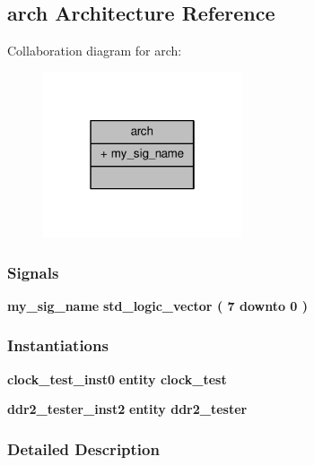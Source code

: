 \subsection{arch Architecture Reference}
\label{classtst__top_1_1arch}


Collaboration diagram for arch\+:\nopagebreak
\begin{figure}[H]
\begin{center}
\leavevmode
\includegraphics[width=166pt]{d9/d9e/classtst__top_1_1arch__coll__graph}
\end{center}
\end{figure}
\subsubsection*{Signals}
 \begin{DoxyCompactItemize}
\item 
{\bf my\+\_\+sig\+\_\+name} {\bfseries \textcolor{comment}{std\+\_\+logic\+\_\+vector}\textcolor{vhdlchar}{ }\textcolor{vhdlchar}{(}\textcolor{vhdlchar}{ }\textcolor{vhdlchar}{ } \textcolor{vhdldigit}{7} \textcolor{vhdlchar}{ }\textcolor{keywordflow}{downto}\textcolor{vhdlchar}{ }\textcolor{vhdlchar}{ } \textcolor{vhdldigit}{0} \textcolor{vhdlchar}{ }\textcolor{vhdlchar}{)}\textcolor{vhdlchar}{ }} 
\end{DoxyCompactItemize}
\subsubsection*{Instantiations}
 \begin{DoxyCompactItemize}
\item 
{\bf clock\+\_\+test\+\_\+inst0}  {\bfseries entity clock\+\_\+test}   
\item 
{\bf ddr2\+\_\+tester\+\_\+inst2}  {\bfseries entity ddr2\+\_\+tester}   
\end{DoxyCompactItemize}


\subsubsection{Detailed Description}


